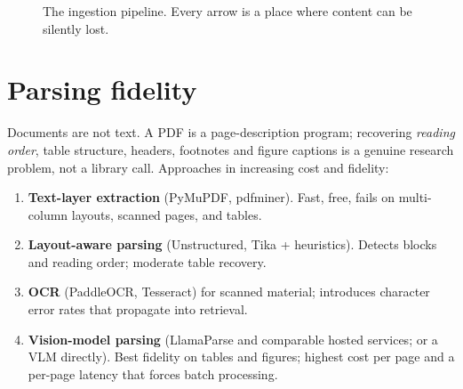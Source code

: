 \documentclass[11pt,twoside,openright]{book}
\theoremstyle{definition}
\theoremstyle{plain}
\theoremstyle{remark}
\newcommand{\term}[1]{\textbf{#1}}
\begin{document}
\begin{figure}[H]
\centering
{}
\caption{The ingestion pipeline. Every arrow is a place where content can be
silently lost.}
\end{figure}

\section{Parsing fidelity}

Documents are not text. A PDF is a page-description program; recovering
\emph{reading order}, table structure, headers, footnotes and figure captions is
a genuine research problem, not a library call. Approaches in increasing cost
and fidelity:

\begin{enumerate}[leftmargin=1.6em]
  \item \term{Text-layer extraction} (PyMuPDF, pdfminer). Fast, free, fails on
        multi-column layouts, scanned pages, and tables.
  \item \term{Layout-aware parsing} (Unstructured, Tika + heuristics). Detects
        blocks and reading order; moderate table recovery.
  \item \term{OCR} (PaddleOCR, Tesseract) for scanned material; introduces
        character error rates that propagate into retrieval.
  \item \term{Vision-model parsing} (LlamaParse and comparable hosted services;
        or a VLM directly). Best fidelity on tables and figures; highest cost per
        page and a per-page latency that forces batch processing.
\end{enumerate}
\end{document}
